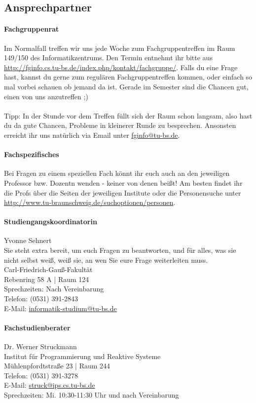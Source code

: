 \subsection{Ansprechpartner}
	\paragraph{Fachgruppenrat}
		Im Normalfall treffen wir uns jede Woche zum Fachgruppentreffen im Raum 149/150 des Informatikzentrums. Den  Termin entnehmt ihr bitte aus \url{http://fginfo.cs.tu-bs.de/index.php/kontakt/fachgruppe/}. Falls du eine Frage hast, kannst du gerne zum regulären Fachgruppentreffen kommen, oder einfach so mal vorbei schauen ob jemand da ist. Gerade im Semester sind die Chancen gut, einen von uns anzutreffen ;) \\\\
		Tipp: In der Stunde vor dem Treffen füllt sich der Raum schon langsam, also hast du da gute Chancen, Probleme in kleinerer Runde zu besprechen. Ansonsten erreicht ihr uns natürlich via Email unter \url{fginfo@tu-bs.de}. 

	\paragraph{Fachspezifisches}
		Bei Fragen zu einem speziellen Fach könnt ihr euch auch an den jeweiligen Professor bzw. Dozentn wenden - keiner von denen beißt! Am besten findet ihr die Profs über die Seiten der jeweiligen Institute oder die Personensuche unter \url{http://www.tu-braunschweig.de/suchoptionen/personen}.

	\paragraph{Studiengangskoordinatorin}
		Yvonne Sehnert \\
		Sie steht extra bereit, um euch Fragen zu beantworten, und für alles, was sie nicht selbst weiß, weiß sie, an wen Sie eure Frage weiterleiten muss.\\
		Carl-Friedrich-Gauß-Fakultät\\
		Rebenring 58 A | Raum 124\\
		Sprechzeiten: Nach  Vereinbarung\\
		Telefon: (0531) 391-2843\\
		E-Mail: \url{informatik-studium@tu-bs.de}

	\paragraph{Fachstudienberater}
		Dr. Werner Struckmann\\
		Institut für Programmierung und Reaktive Systeme\\
		Mühlenpfordtstraße 23 | Raum 244\\
		Telefon: (0531) 391-3278\\
		E-Mail: \url{struck@ips.cs.tu-bs.de}\\
		Sprechzeiten: Mi. 10:30-11:30 Uhr und nach  Vereinbarung

